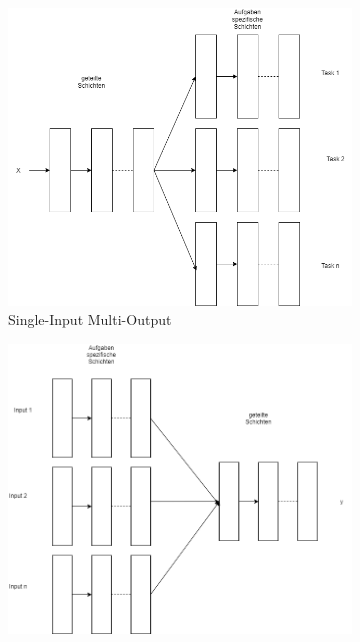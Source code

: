 		\begin{figure}[h]
			\centering
			\begin{subfigure}[c]{0.45\textwidth}			
				\includegraphics[width=1\textwidth, center]{bilder/Grundlagen/MTL/MTL_SIMO.png}
				\caption[MTL-SIMO]{Single-Input Multi-Output}
				\label{img:MTL_SIMO}	
			\end{subfigure}
			\begin{subfigure}[c]{0.45\textwidth}			
				\includegraphics[width=1\textwidth, center]{bilder/Grundlagen/MTL/MTL_MISO.png}

\end{subfigure}
\end{figure}
